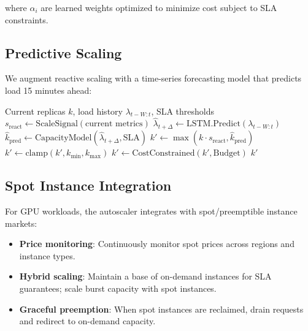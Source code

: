 where $\alpha_i$ are learned weights optimized to minimize cost subject to SLA constraints.

\subsection{Predictive Scaling}

We augment reactive scaling with a time-series forecasting model that predicts load 15 minutes ahead:

\begin{algorithm}[H]
\caption{Predictive Autoscaler}
\label{alg:autoscaler}
\begin{algorithmic}[1]
\Require Current replicas $k$, load history $\lambda_{t-W:t}$, SLA thresholds
\State {}
\State $s_{\text{react}} \gets \text{ScaleSignal}(\text{current metrics})$
\State {}
\State $\hat{\lambda}_{t+\Delta} \gets \text{LSTM.Predict}(\lambda_{t-W:t})$
\State $\hat{k}_{\text{pred}} \gets \text{CapacityModel}(\hat{\lambda}_{t+\Delta}, \text{SLA})$
\State {}
\State $k' \gets \max(k \cdot s_{\text{react}}, \hat{k}_{\text{pred}})$
\State $k' \gets \text{clamp}(k', k_{\min}, k_{\max})$
\State {}
    \State $k' \gets \text{CostConstrained}(k', \text{Budget})$
\EndIf
\State \Return $k'$
\end{algorithmic}
\end{algorithm}

\subsection{Spot Instance Integration}

For GPU workloads, the autoscaler integrates with spot/preemptible instance markets:

\begin{itemize}[leftmargin=1.1em]
    \item \textbf{Price monitoring}: Continuously monitor spot prices across regions and instance types.
    \item \textbf{Hybrid scaling}: Maintain a base of on-demand instances for SLA guarantees; scale burst capacity with spot instances.
    \item \textbf{Graceful preemption}: When spot instances are reclaimed, drain requests and redirect to on-demand capacity.
\end{itemize}

